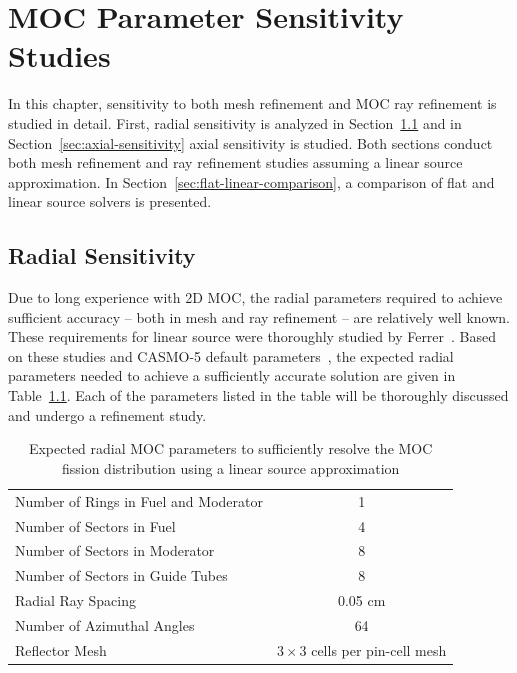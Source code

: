 \chapter{MOC Parameter Sensitivity Studies}
\label{chap:moc-sensitivity}

In this chapter, sensitivity to both mesh refinement and \ac{MOC} ray refinement is studied in detail. First, radial sensitivity is analyzed in Section~\ref{sec:radial-sensitivity} and in Section~\ref{sec:axial-sensitivity} axial sensitivity is studied. Both sections conduct both mesh refinement and ray refinement studies assuming a linear source approximation. In Section~\ref{sec:flat-linear-comparison}, a comparison of flat and linear source solvers is presented.

\section{Radial Sensitivity}
\label{sec:radial-sensitivity}

Due to long experience with 2D \ac{MOC}, the radial parameters required to achieve sufficient accuracy -- both in mesh and ray refinement -- are relatively well known. These requirements for linear source were thoroughly studied by Ferrer~\cite{ferrer2012linear}. Based on these studies and CASMO-5 default parameters~\cite{rhodes2006casmo}, the expected radial parameters needed to achieve a sufficiently accurate solution are given in Table~\ref{tab:expected-radial-params}. Each of the parameters listed in the table will be thoroughly discussed and undergo a refinement study.

\begin{table}[ht]
	\centering
	\caption{Expected radial MOC parameters to sufficiently resolve the \ac{MOC} fission distribution using a linear source approximation}
	\medskip
	\begin{tabular}{lc}
		\hline
		Number of Rings in Fuel and Moderator & 1 \\
		Number of Sectors in Fuel & 4 \\
		Number of Sectors in Moderator & 8 \\
		Number of Sectors in Guide Tubes & 8 \\	
		Radial Ray Spacing & 0.05 cm \\
		Number of Azimuthal Angles & 64 \\
		Reflector Mesh & $3 \times 3$ cells per pin-cell mesh \\
		\hline
	\end{tabular}
	\label{tab:expected-radial-params}
\end{table}

